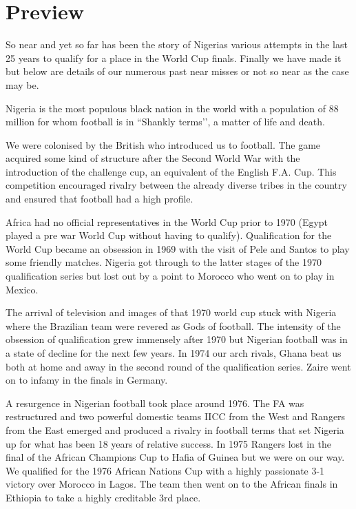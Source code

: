 \section{Preview}
So near and yet so far has been the story of Nigerias various attempts in the 
last 25 years to qualify for a place in the World Cup finals. Finally we have 
made it but below are details of our numerous past near misses or not so near
as the case may be.

Nigeria is the most populous black nation in the world with a population of 88
million for whom football is in ``Shankly terms’’, a matter of life and death.

We were colonised by the British who introduced us to football. The game 
acquired some kind of structure after the Second World War with the 
introduction of the challenge cup, an equivalent of the English F.A. Cup. This
competition encouraged rivalry between the already diverse tribes in the 
country and ensured that football had a high profile.

Africa had no official representatives in the World Cup prior to 1970 (Egypt 
played a pre war World Cup without having to qualify). Qualification for the 
World Cup became an obsession in 1969 with the visit of Pele and Santos to play
some friendly matches. Nigeria got through to the latter stages of the 1970 
qualification series but lost out by a point to Morocco who went on to play in 
Mexico.

The arrival of television and images of that 1970 world cup stuck with Nigeria 
where the Brazilian team were revered as Gods of football. The intensity of the
obsession of qualification grew immensely after 1970 but Nigerian football was
in a state of decline for the next few years. In 1974 our arch rivals, Ghana 
beat us both at home and away in the second round of the qualification series.
Zaire went on to infamy in the finals in Germany.

A resurgence in Nigerian football took place around 1976. The FA was 
restructured and two powerful domestic teams IICC from the West and Rangers 
from the East emerged and produced a rivalry in football terms that set Nigeria
up for what has been 18 years of relative success. In 1975 Rangers lost in the 
final of the African Champions Cup to Hafia of Guinea but we were on our way. 
We qualified for the 1976 African Nations Cup with a highly passionate 3-1 
victory over Morocco in Lagos. The team then went on to the African finals in 
Ethiopia to take a highly creditable 3rd place.


